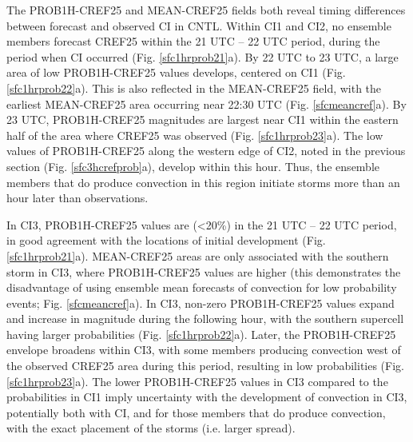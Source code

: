 The PROB1H-CREF25 and MEAN-CREF25 fields both reveal timing differences between forecast and observed CI in CNTL. Within CI1 and CI2, no ensemble members forecast CREF25 within the 21 UTC -- 22 UTC period, during the period when CI occurred (Fig. \ref{sfc1hrprob21}a). By 22 UTC to 23 UTC, a large area of low PROB1H-CREF25 values develops, centered on CI1 (Fig. \ref{sfc1hrprob22}a). This is also reflected in the MEAN-CREF25 field, with the earliest MEAN-CREF25 area occurring near 22:30 UTC (Fig. \ref{sfcmeancref}a). By 23 UTC, PROB1H-CREF25 magnitudes are largest near CI1 within the eastern half of the area where CREF25 was observed (Fig. \ref{sfc1hrprob23}a). The low values of PROB1H-CREF25 along the western edge of CI2, noted in the previous section (Fig. \ref{sfc3hcrefprob}a), develop within this hour. Thus, the ensemble members that do produce convection in this region initiate storms more than an hour later than observations.

In CI3, PROB1H-CREF25 values are (\textless 20\%) in the 21 UTC -- 22 UTC period, in good agreement with the locations of initial development (Fig. \ref{sfc1hrprob21}a). MEAN-CREF25 areas are only associated with the southern storm in CI3, where PROB1H-CREF25 values are higher (this demonstrates the disadvantage of using ensemble mean forecasts of convection for low probability events; Fig. \ref{sfcmeancref}a). In CI3, non-zero PROB1H-CREF25 values expand and increase in magnitude during the following hour, with the southern supercell having larger probabilities (Fig. \ref{sfc1hrprob22}a). Later, the PROB1H-CREF25 envelope broadens within CI3, with some members producing convection west of the observed CREF25 area during this period, resulting in low probabilities (Fig. \ref{sfc1hrprob23}a). The lower PROB1H-CREF25 values in CI3 compared to the probabilities in CI1 imply uncertainty with the development of convection in CI3, potentially both with CI, and for those members that do produce convection, with the exact placement of the storms (i.e. larger spread).

